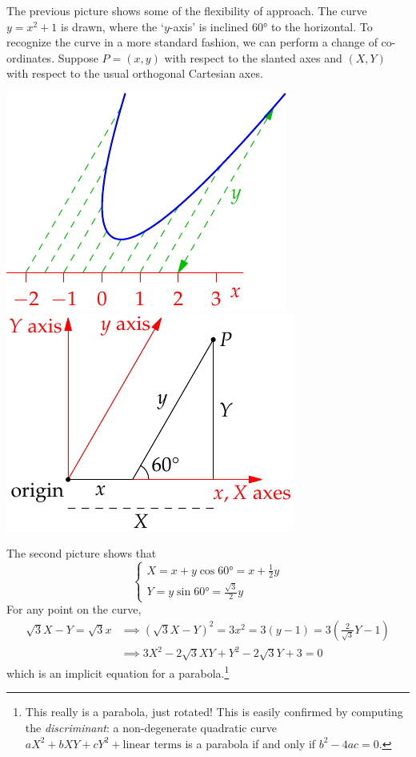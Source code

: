  The previous picture shows some of the flexibility of approach. The curve $y=x^2+1$ is drawn, where the `$y$-axis' is inclined \ang{60} to the horizontal. To recognize the curve in a more standard fashion, we can perform a change of co-ordinates. Suppose $P=(x,y)$ with respect to the slanted axes and $(X,Y)$ with respect to the usual orthogonal Cartesian axes.
\begin{center}
\includegraphics{analytic-parab}
\qquad\qquad
\includegraphics{analytic-parab2}
\end{center}
The second picture shows that
\[\begin{cases}
X=x+y\cos \ang{60}=x+\frac 12y \\
Y=y\sin \ang{60}=\frac{\sqrt 3}2y
\end{cases}\]
For any point on the curve,
\begin{align*}
\sqrt 3X-Y=\sqrt 3x&\implies (\sqrt 3X-Y)^2=3x^2=3(y-1)=3\left(\frac 2{\sqrt 3}Y-1\right)\\
&\implies 3X^2-2\sqrt 3 XY+Y^2-2\sqrt 3Y+3=0
\end{align*}
which is an implicit equation for a parabola.\footnote{This really is a parabola, just rotated! This is easily confirmed by computing the \emph{discriminant}: a non-degenerate quadratic curve $aX^2+bXY+cY^2+\text{linear terms}$ is a parabola if and only if $b^2-4ac=0$.}

